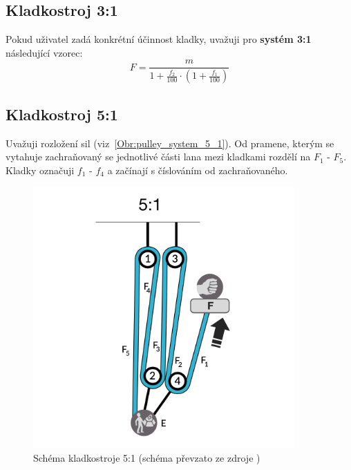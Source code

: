 \subsection{Kladkostroj 3:1}
Pokud uživatel zadá konkrétní účinnost kladky, uvažuji pro \textbf{systém 3:1} následující vzorec:
\begin{equation}
    \label{eqn:calculation_3_1}
    F = \frac{m}{1 + \frac{f_2}{100} \cdot (1 + \frac{f_1}{100})}
\end{equation}

\subsection{Kladkostroj 5:1}
Uvažuji rozložení sil (viz~\autoref{Obr:pulley_system_5_1}). Od pramene, kterým se vytahuje zachraňovaný se jednotlivé části lana mezi kladkami rozdělí na ${F_1}$ - ${F_5}$. Kladky označuji ${f_1}$ - ${f_4}$ a začínají s číslováním od zachraňovaného.
\begin{figure}[!hbt]
    \centering
    \includegraphics[width=10.0cm]{Figures/5_1/3_haul_syste_5_1_changed.png}
    \caption[Schéma kladkostroje 5:1]{Schéma kladkostroje 5:1 (schéma převzato ze zdroje \cite{Petzl_2022})}
    \label{Obr:pulley_system_5_1}
\end{figure} 

